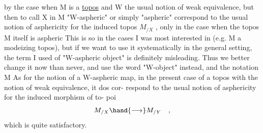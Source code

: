 
 by the case when M is a \uline{topos} and W the usual notion of weak equivalence,
but then to call X in M  "W-aspheric" or simply "aspheric"  correspond to
the usual notion of asphericity for the induced topos $M_{/X}$ , only in the
case when the  topos M itself is aspheric\hand{,}  This is  so in the cases
I was most interested in (e.g. M a modeizing topos),  but if we want to
use it systematically in the general setting,  the 
term I used of "W-aspheric object" is definitely misleading.  Thus we
better change it now than never,  and use the word "W-object" instead,
and the notation M As for the notion of a W-aspheric map,  in the
present case of a topos with the notion of weak equivalence,  it dos cor-%
respond to the usual notion of asphericity for the induced morphism of to-%
poi
\[ M_{/X} \hand{\longrightarrow} M_{/Y} \quad , \]
which is quite satisfactory.

